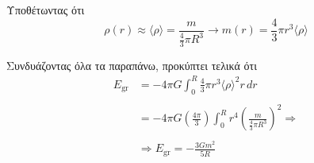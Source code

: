 Υποθέτωντας ότι 
\begin{equation}
    \rho(r) \approx \langle \rho \rangle = \frac{m}{\frac{4}{3} \pi R^3} \longrightarrow m(r) = \frac{4}{3} \pi r^3 \langle \rho \rangle
\end{equation}

Συνδυάζοντας όλα τα παραπάνω, προκύπτει τελικά ότι
\begin{align}
\label{eq:gravitational_potential_energy}
    \nonumber E_{\text{gr}} &= -4 \pi G \int_{0}^{R} \frac{4}{3} \pi r^3 \langle \rho \rangle^2 r \,dr \\\nonumber \\
    \nonumber &= -4\pi G \left( \frac{4\pi}{3} \right) \int_{0}^{R} r^4 \left( \frac{m}{\frac{4}{3} \pi R^3} \right)^2 \Rightarrow \\\nonumber \\
    &\Rightarrow \boxed{E_{\text{gr}} = - \frac{3Gm^2}{5R}}
\end{align}
